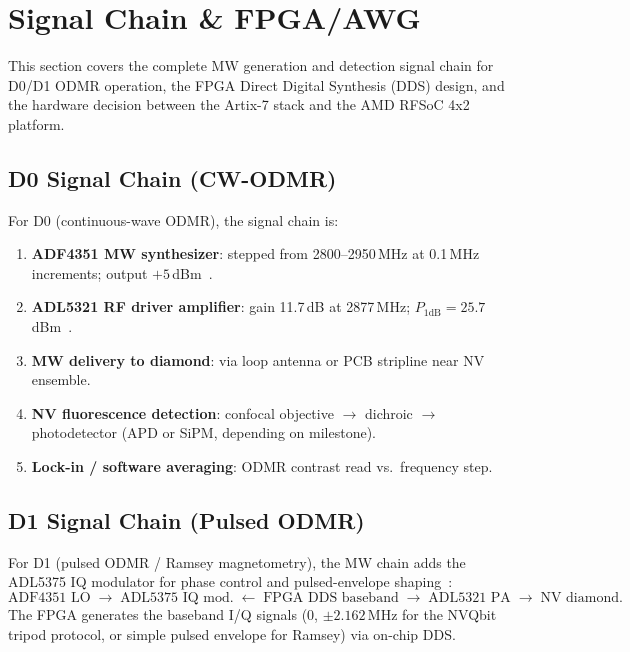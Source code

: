 
\section{Signal Chain \& FPGA/AWG}
\label{sec:signal-chain}

This section covers the complete MW generation and detection signal chain for D0/D1
ODMR operation, the FPGA Direct Digital Synthesis (DDS) design, and the hardware
decision between the Artix-7 stack and the AMD RFSoC 4x2 platform.

\subsection{D0 Signal Chain (CW-ODMR)}

For D0 (continuous-wave ODMR), the signal chain is:
\begin{enumerate}
  \item \textbf{ADF4351 MW synthesizer}: stepped from 2800--2950\,MHz at 0.1\,MHz increments;
    output $+5$\,dBm~\cite{ADF4351datasheet}. %
  \item \textbf{ADL5321 RF driver amplifier}: gain 11.7\,dB at 2877\,MHz;
    $P_{1\text{dB}} = 25.7$\,dBm~\cite{ADL5321datasheet}.
  \item \textbf{MW delivery to diamond}: via loop antenna or PCB stripline near NV ensemble.
  \item \textbf{NV fluorescence detection}: confocal objective $\to$ dichroic $\to$ photodetector
    (APD or SiPM, depending on milestone).
  \item \textbf{Lock-in / software averaging}: ODMR contrast read vs.\ frequency step.
\end{enumerate}

\subsection{D1 Signal Chain (Pulsed ODMR)}

For D1 (pulsed ODMR / Ramsey magnetometry), the MW chain adds the ADL5375 IQ modulator
for phase control and pulsed-envelope shaping~\cite{ADL5375datasheet}:
\begin{equation*}
  \text{ADF4351 LO}
  \;\to\;
  \text{ADL5375 IQ mod.}
  \;\leftarrow\;
  \text{FPGA DDS baseband}
  \;\to\;
  \text{ADL5321 PA}
  \;\to\;
  \text{NV diamond}.
\end{equation*}
The FPGA generates the baseband I/Q signals (0, $\pm 2.162$\,MHz for the NVQbit tripod
protocol, or simple pulsed envelope for Ramsey) via on-chip DDS.

